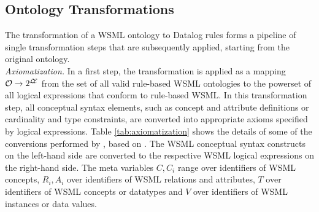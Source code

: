 \def\mvexpr{\ensuremath{E}}
\def\mvex{\ensuremath{E_x}}
\def\mvey{\ensuremath{E_y}}
\def\mvez{\ensuremath{E_z}}
\def\mve1{\ensuremath{E_1}}
\def\mven{\ensuremath{E_n}}

\subsection{Ontology Transformations}
The transformation of a WSML ontology to Datalog rules forms a
pipeline of single transformation steps that are subsequently
applied, starting from the original ontology.\\[2mm]
{\it Axiomatization.} In a first step, the transformation \transax
is applied as a mapping $\mathcal{O} \rightarrow 2^{\mathcal{L\!E}}$ from the set
of all valid rule-based WSML ontologies to the powerset of all
logical expressions that conform to rule-based WSML. In this
transformation step, all conceptual syntax elements, such as concept
and attribute definitions or cardinality and type constraints, are
converted into appropriate axioms specified by logical expressions.
Table \ref{tab:axiomatization} shows the details of some of the
conversions performed by \transax, based on \cite{wsml-spec}. The
WSML conceptual syntax constructs on the left-hand side are
converted to the respective WSML logical expressions on the
right-hand side. The meta variables $C,C_i$ range over identifiers
of WSML concepts, $R_i,A_i$ over identifiers of WSML relations and
attributes, $T$ over identifiers of WSML concepts or datatypes and
$V$ over identifiers of WSML instances or data values.
